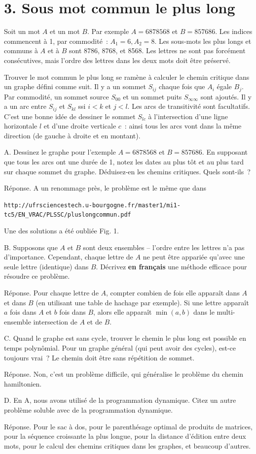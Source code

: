 \documentclass[11pt]{article}
\begin{document}
{
\section*{3. Sous mot commun le plus long}
Soit un mot $A$ et un mot $B$. 
Par exemple $A=6878568$ et $B=857686$. 
Les indices commencent à 1, par commodité~: $A_1=6, A_2=8$.
Les sous-mots les plus longs et communs à $A$ et à $B$ sont
8786, 8768, et 8568. Les lettres ne sont pas forcément consécutives, mais l'ordre des lettres dans les deux mots doit être préservé.

Trouver le mot commun le plus long se ramène à calculer le chemin critique dans un graphe défini comme suit. Il y a un sommet $S_{ij}$ chaque fois que $A_i$ égale $B_j$. Par commodité, un sommet source $S_{00}$ et un sommet puits $S_{\infty\infty}$ sont ajoutés. Il y a un arc entre $S_{ij}$ et $S_{kl}$ ssi $i<k$ et $j<l$.
Les arcs de transitivité sont facultatifs.
C'est une bonne idée de dessiner le sommet $S_{lc}$ à l'intersection d'une ligne horizontale $l$ et d'une droite verticale $c$~: ainsi tous les arcs vont dans la même direction (de gauche à droite et en montant).  

A. Dessinez le graphe pour l'exemple $A=6878568$ et $B=857686$.
En supposant que tous les arcs ont une durée de 1, notez les dates au plus tôt
et au plus tard sur chaque sommet du graphe. Déduisez-en les chemins critiques.
Quels sont-ils~? 


Réponse.  A un renommage près, le problème est le même que dans

{\small
\verb&http://ufrsciencestech.u-bourgogne.fr/master1/mi1-tc5/EN_VRAC/PLSSC/pluslongcommun.pdf&}

Une des solutions a été oubliée Fig. 1.

B. Supposons que $A$ et $B$ sont deux ensembles -- l'ordre entre les lettres n'a pas d'importance. Cependant, chaque lettre de $A$ ne peut être appariée 
qu'avec une seule lettre (identique) dans $B$. 
Décrivez {\bf en français} une méthode efficace pour résoudre ce problème.

Réponse. Pour chaque lettre de $A$, compter combien de fois elle apparaît dans
$A$ et dans $B$ (en utilisant une table de hachage par exemple).
Si une lettre apparaît $a$ fois dans $A$ et $b$ fois dans $B$,
alors elle apparaît $\min(a, b)$ dans le multi-ensemble intersection de $A$ et de $B$.

C. Quand le graphe est sans cycle, trouver le chemin le plus long est possible en temps polynômial. Pour un graphe général (qui peut avoir des cycles), est-ce toujours vrai~? Le chemin doit être sans répétition de sommet.

Réponse. Non, c'est un problème difficile, qui généralise le problème du chemin hamiltonien.

D. En A, nous avons utilisé de la programmation dynamique. Citez un autre problème soluble avec de la programmation dynamique.

Réponse.
Pour le sac à dos, pour le parenthésage optimal de produits de matrices, pour la séquence croissante la plus longue, pour la distance d'édition entre deux mots,
pour le calcul des chemins critiques dans les graphes, et beaucoup d'autres.
}
\end{document}

